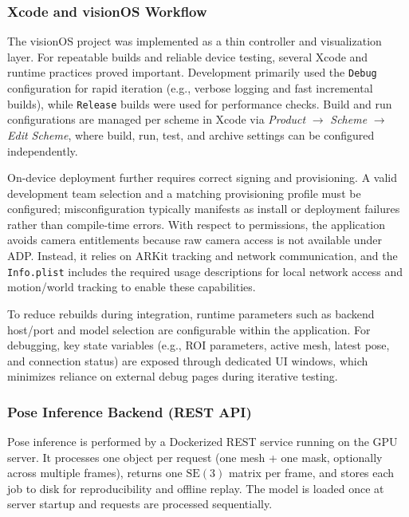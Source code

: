 \subsubsection{Xcode and visionOS Workflow}
\label{subsec:xcode_workflow}

The visionOS project was implemented as a thin controller and visualization layer. For repeatable builds and reliable device testing, several Xcode and runtime practices proved important. Development primarily used the \texttt{Debug} configuration for rapid iteration (e.g., verbose logging and fast incremental builds), while \texttt{Release} builds were used for performance checks. Build and run configurations are managed per scheme in Xcode via \emph{Product} $\rightarrow$ \emph{Scheme} $\rightarrow$ \emph{Edit Scheme}, where build, run, test, and archive settings can be configured independently.

On-device deployment further requires correct signing and provisioning. A valid development team selection and a matching provisioning profile must be configured; misconfiguration typically manifests as install or deployment failures rather than compile-time errors. With respect to permissions, the application avoids camera entitlements because raw camera access is not available under ADP. Instead, it relies on ARKit tracking and network communication, and the \texttt{Info.plist} includes the required usage descriptions for local network access and motion/world tracking to enable these capabilities.

To reduce rebuilds during integration, runtime parameters such as backend host/port and model selection are configurable within the application. For debugging, key state variables (e.g., ROI parameters, active mesh, latest pose, and connection status) are exposed through dedicated UI windows, which minimizes reliance on external debug pages during iterative testing.


\subsubsection{Pose Inference Backend (REST API)}
\label{subsec:pose_api}

Pose inference is performed by a Dockerized REST service running on the GPU server. It processes one object per request (one mesh + one mask, optionally across multiple frames), returns one $\mathrm{SE}(3)$ matrix per frame, and stores each job to disk for reproducibility and offline replay. The model is loaded once at server startup and requests are processed sequentially.

